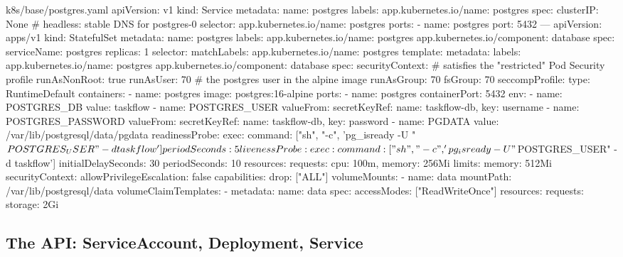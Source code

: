 \begin{yamlcode}{k8s/base/postgres.yaml}
apiVersion: v1
kind: Service
metadata:
  name: postgres
  labels:
    app.kubernetes.io/name: postgres
spec:
  clusterIP: None                       # headless: stable DNS for postgres-0
  selector:
    app.kubernetes.io/name: postgres
  ports:
    - name: postgres
      port: 5432
---
apiVersion: apps/v1
kind: StatefulSet
metadata:
  name: postgres
  labels:
    app.kubernetes.io/name: postgres
    app.kubernetes.io/component: database
spec:
  serviceName: postgres
  replicas: 1
  selector:
    matchLabels:
      app.kubernetes.io/name: postgres
  template:
    metadata:
      labels:
        app.kubernetes.io/name: postgres
        app.kubernetes.io/component: database
    spec:
      securityContext:                  # satisfies the "restricted" Pod Security profile
        runAsNonRoot: true
        runAsUser: 70                   # the postgres user in the alpine image
        runAsGroup: 70
        fsGroup: 70
        seccompProfile:
          type: RuntimeDefault
      containers:
        - name: postgres
          image: postgres:16-alpine
          ports:
            - name: postgres
              containerPort: 5432
          env:
            - name: POSTGRES_DB
              value: taskflow
            - name: POSTGRES_USER
              valueFrom:
                secretKeyRef: { name: taskflow-db, key: username }
            - name: POSTGRES_PASSWORD
              valueFrom:
                secretKeyRef: { name: taskflow-db, key: password }
            - name: PGDATA
              value: /var/lib/postgresql/data/pgdata
          readinessProbe:
            exec:
              command: ["sh", "-c", 'pg_isready -U "$POSTGRES_USER" -d taskflow']
            periodSeconds: 5
          livenessProbe:
            exec:
              command: ["sh", "-c", 'pg_isready -U "$POSTGRES_USER" -d taskflow']
            initialDelaySeconds: 30
            periodSeconds: 10
          resources:
            requests: { cpu: 100m, memory: 256Mi }
            limits:   { memory: 512Mi }
          securityContext:
            allowPrivilegeEscalation: false
            capabilities:
              drop: ["ALL"]
          volumeMounts:
            - name: data
              mountPath: /var/lib/postgresql/data
  volumeClaimTemplates:
    - metadata:
        name: data
      spec:
        accessModes: ["ReadWriteOnce"]
        resources:
          requests:
            storage: 2Gi
\end{yamlcode}

\subsection{The API: ServiceAccount, Deployment, Service}

